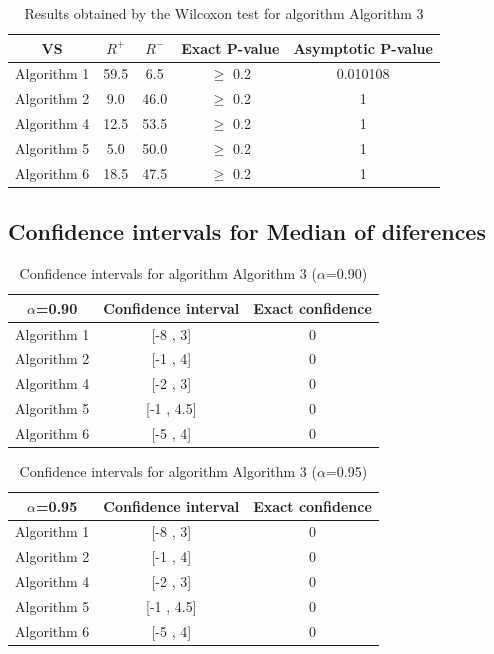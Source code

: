 \documentclass[a4paper,10pt]{article}
\begin{document}
\begin{table}[!htp]
\centering\small
\begin{tabular}{
|c|c|c|c|c|}
\hline
 VS & $R^{+}$ & $R^{-}$ & Exact P-value & Asymptotic P-value \\ \hline 
Algorithm 1 & 59.5 & 6.5 & $\geq$ 0.2 & 0.010108\\ \hline 
Algorithm 2 & 9.0 & 46.0 & $\geq$ 0.2 & 1\\ \hline 
Algorithm 4 & 12.5 & 53.5 & $\geq$ 0.2 & 1\\ \hline 
Algorithm 5 & 5.0 & 50.0 & $\geq$ 0.2 & 1\\ \hline 
Algorithm 6 & 18.5 & 47.5 & $\geq$ 0.2 & 1\\ \hline 

\end{tabular}
\caption{Results obtained by the Wilcoxon test for algorithm Algorithm 3}
\end{table}

\subsection{Confidence intervals for Median of diferences}

\begin{table}[!htp]
\centering\small
\begin{tabular}{
|c|c|c|}
\hline
 $\alpha$=0.90 & Confidence interval & Exact confidence \\ \hline 
Algorithm 1 & [-8 , 3] & 0\\ \hline 
Algorithm 2 & [-1 , 4] & 0\\ \hline 
Algorithm 4 & [-2 , 3] & 0\\ \hline 
Algorithm 5 & [-1 , 4.5] & 0\\ \hline 
Algorithm 6 & [-5 , 4] & 0\\ \hline 

\end{tabular}
\caption{Confidence intervals for algorithm Algorithm 3 ($\alpha$=0.90)}
\end{table}
\begin{table}[!htp]
\centering\small
\begin{tabular}{
|c|c|c|}
\hline
 $\alpha$=0.95 & Confidence interval & Exact confidence \\ \hline 
Algorithm 1 & [-8 , 3] & 0\\ \hline 
Algorithm 2 & [-1 , 4] & 0\\ \hline 
Algorithm 4 & [-2 , 3] & 0\\ \hline 
Algorithm 5 & [-1 , 4.5] & 0\\ \hline 
Algorithm 6 & [-5 , 4] & 0\\ \hline 

\end{tabular}
\caption{Confidence intervals for algorithm Algorithm 3 ($\alpha$=0.95)}
\end{table}
\end{document}
